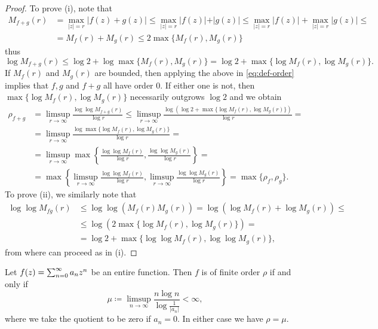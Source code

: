 \begin{proof}
    To prove (i), note that
    \begin{align*}
        M_{f+g}(r) &= \max_{\vert z \vert = r} \vert f(z) + g(z) \vert \leq \max_{\vert z \vert = r} \vert f(z) \vert + \vert g(z) \vert \leq \max_{\vert z \vert = r} \vert f(z) \vert + \max_{\vert z \vert = r} \vert g(z) \vert \leq \\
        &= M_f(r) + M_g(r) \leq 2 \max \{ M_f(r), M_g(r) \}
    \end{align*}
    thus
    $$ \log M_{f+g}(r) \leq \log 2 + \log \max \{ M_f(r), M_g(r) \} = \log 2 + \max \{ \log M_f(r), \log M_g(r) \}. $$
    If $M_f(r)$ and $M_g(r)$ are bounded, then applying the above in \cref{eq:def-order} implies that $f, g$ and $f+g$ all have order $0$. If either one is not, then $\max \{ \log M_f(r), \log M_g(r) \}$ necessarily outgrows $\log 2$ and we obtain
    \begin{align*}
        \rho_{f+g} &= \limsup_{r \to \infty} \frac{\log \log M_{f+g}(r)}{\log r} \leq \limsup_{r \to \infty} \frac{\log (\log 2 + \max \{ \log M_f(r), \log M_g(r) \})}{\log r} = \\
        &= \limsup_{r \to \infty} \frac{\log \max \{ \log M_f(r), \log M_g(r) \}}{\log r} = \\
        &= \limsup_{r \to \infty} \max \left\{ \frac{\log \log M_f(r)}{\log r}, \frac{\log \log M_g(r)}{\log r} \right\} = \\
        &= \max \left\{ \limsup_{r \to \infty} \frac{\log \log M_f(r)}{\log r}, \limsup_{r \to \infty} \frac{\log \log M_g(r)}{\log r} \right\} = \max \{ \rho_f, \rho_g \}.
    \end{align*}
    To prove (ii), we similarly note that
    \begin{align*}
        \log \log M_{fg}(r) &\leq \log \log ( M_f(r) M_g(r) ) = \log (\log M_f(r) + \log M_g(r)) \leq \\
        &\leq \log (2 \max \{ \log M_f(r), \log M_g(r) \}) = \\
        &= \log 2 + \max \{ \log \log M_f(r), \log \log M_g(r) \},
    \end{align*}
    from where can proceed as in (i).
\end{proof}

\begin{theorem} \label{thm:order-power-series}
    Let $f(z) = \sum_{n=0}^\infty {a_n}z^{n}$ be an entire function. Then $f$ is of finite order $\rho$ if and only if
    $$ \mu \coloneqq \limsup_{n \to \infty} \frac{n \log n}{\log \frac{1}{\vert a_n \vert}} < \infty, $$
    where we take the quotient to be zero if $a_n = 0$. In either case we have $\rho = \mu$.
\end{theorem}

